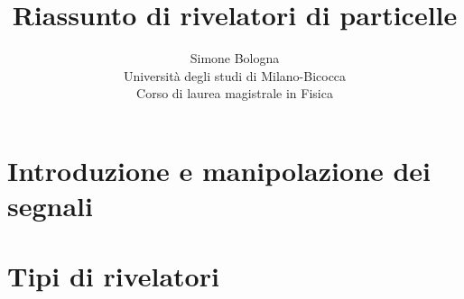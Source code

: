 \documentclass[12pt,a4paper,titlepage]{report}
\begin{document}
\begin{titlepage}
\title{Riassunto di rivelatori di particelle}
\author{Simone Bologna\\Universit\`a degli studi di Milano-Bicocca\\Corso di laurea magistrale in Fisica}
\date{}
\end{titlepage}
\pagestyle{plain}
\maketitle
\setcounter{page}{2}
\tableofcontents
\part{Introduzione e manipolazione dei segnali}







\part{Tipi di rivelatori}








\end{document}
